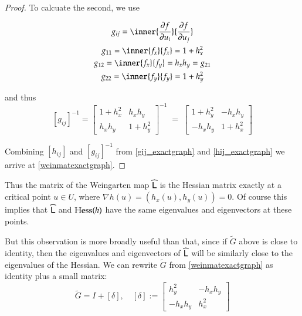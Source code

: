 \begin{proof}
	 To calcuate the second, we use
	 
	 
	 
	 \begin{equation}
	 \begin{gathered}
	 g_{ij} = \inner{\frac{\partial f}{\partial u_i}}{\frac{\partial f}{\partial u_j}} \\
	 g_{11} = \inner{f_x}{f_x} = 1 + h_x^2 \\
	 g_{12} = \inner{f_x}{f_y} = h_x h_y = g_{21} \\
	 g_{22} = \inner{f_y}{f_y} = 1 + h_y^2
	 \end{gathered}
	 \end{equation}
	 
	 and thus
		\begin{equation} \label{gij_exactgraph}		 
		[g_{ij}]^{-1} = \begin{bmatrix} 1 + h_x^2 & h_x h_y \\
					h_x h_y & 1 + h_y^2 \end{bmatrix}^{-1}
					\;=\;	\begin{bmatrix} 1 + h_y^2 & -h_x h_y \\
					-	h_x h_y & 1 + h_x^2 \end{bmatrix}
		\end{equation}
       	
       	Combining $[h_{ij}]$ and $[g_{ij}]^{-1}$ from \cref{gij_exactgraph} and \cref{hij_exactgraph}
       	we arrive at \cref{weinmatexactgraph}.
       	\end{proof}
       	
  Thus the matrix of the Weingarten map $\widehat{\mathsf{L}}$ is the Hessian matrix exactly at a critical point $u \in  U$, where $\nabla h(u) = (h_x(u), h_y(u)) = 0$. Of course this implies that $\widehat{\mathsf{L}}$ and $\mathrm{Hess}{(h)}$ have the same eigenvalues and eigenvectors at these points.
  
But this observation is more broadly useful than that, since if $\tilde{G}$ above is close to identity, then the eigenvalues and eigenvectors of $\widehat{\mathsf{L}}$ will be similarly close to the eigenvalues of the Hessian. We can rewrite $\tilde{G}$ from \cref{weinmatexactgraph} as identity plus a small matrix:
\begin{equation}
\tilde{G} = I + [\delta], \quad  [\delta] := \begin{bmatrix} h_y^2 & -h_x h_y \\ -h_x h_y & h_x^2 \end{bmatrix}
\end{equation}


